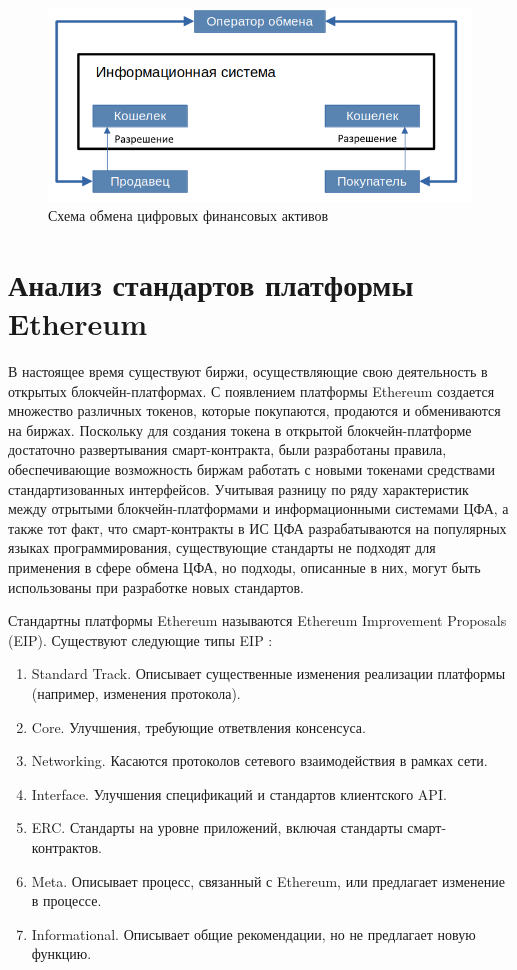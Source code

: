 \documentclass[a4paper, 10pt]{article}
\begin{document}
	\begin{figure}
		\includegraphics[width=16cm]{schema}
		\centering
		\caption{Схема обмена цифровых финансовых активов}
		\label{figure:schema}
	\end{figure}
	
	\section*{Анализ стандартов платформы Ethereum}
	
	В настоящее время существуют биржи, осуществляющие свою деятельность в открытых блокчейн-платформах. С появлением платформы Ethereum создается множество различных токенов, которые покупаются, продаются и обмениваются на биржах. Поскольку для создания токена в открытой блокчейн-платформе достаточно развертывания смарт-контракта, были разработаны правила, обеспечивающие возможность биржам работать с новыми токенами средствами стандартизованных интерфейсов. Учитывая разницу по ряду характеристик между отрытыми блокчейн-платформами и информационными системами ЦФА, а также тот факт, что смарт-контракты в ИС ЦФА разрабатываются на популярных языках программирования, существующие стандарты не подходят для применения в сфере обмена ЦФА, но подходы, описанные в них, могут быть использованы при разработке новых стандартов. 
	
	Стандартны платформы Ethereum называются Ethereum Improvement Proposals (EIP). Существуют следующие типы EIP \cite{ru:eip}:
	
	\begin{enumerate}
		\itemsep0em
		\item Standard Track. Описывает существенные изменения реализации платформы (например, изменения протокола).
		\item Core. Улучшения, требующие ответвления консенсуса.
		\item Networking. Касаются протоколов сетевого взаимодействия в рамках сети.
		\item Interface. Улучшения спецификаций и стандартов клиентского API.
		\item ERC. Стандарты на уровне приложений, включая стандарты смарт-контрактов.
		\item Meta. Описывает процесс, связанный с Ethereum, или предлагает изменение в процессе.
		\item Informational. Описывает общие рекомендации, но не предлагает новую функцию.
	\end{enumerate}
	
\end{document}
